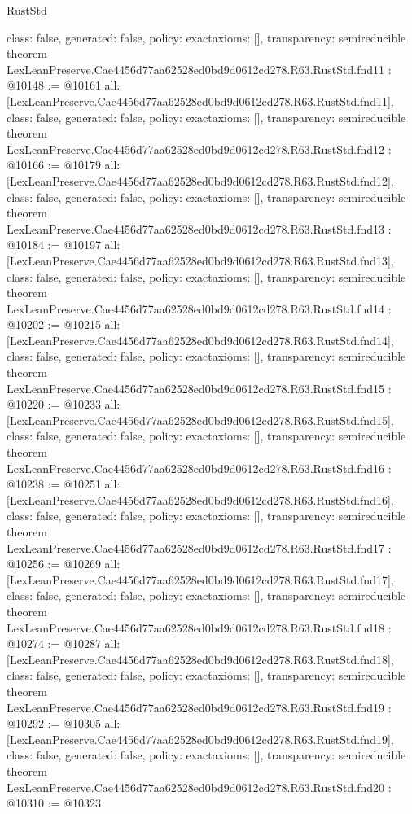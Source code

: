 \begin{lexlean}{RustStd}
\begin{coremodule}
{  class: false,
  generated: false,
  policy: exact{axioms: []},
  transparency: semireducible
}
theorem LexLeanPreserve.Cae4456d77aa62528ed0bd9d0612cd278.R63.RustStd.fnd11 : @10148 := @10161 {
  all: [LexLeanPreserve.Cae4456d77aa62528ed0bd9d0612cd278.R63.RustStd.fnd11],
  class: false,
  generated: false,
  policy: exact{axioms: []},
  transparency: semireducible
}
theorem LexLeanPreserve.Cae4456d77aa62528ed0bd9d0612cd278.R63.RustStd.fnd12 : @10166 := @10179 {
  all: [LexLeanPreserve.Cae4456d77aa62528ed0bd9d0612cd278.R63.RustStd.fnd12],
  class: false,
  generated: false,
  policy: exact{axioms: []},
  transparency: semireducible
}
theorem LexLeanPreserve.Cae4456d77aa62528ed0bd9d0612cd278.R63.RustStd.fnd13 : @10184 := @10197 {
  all: [LexLeanPreserve.Cae4456d77aa62528ed0bd9d0612cd278.R63.RustStd.fnd13],
  class: false,
  generated: false,
  policy: exact{axioms: []},
  transparency: semireducible
}
theorem LexLeanPreserve.Cae4456d77aa62528ed0bd9d0612cd278.R63.RustStd.fnd14 : @10202 := @10215 {
  all: [LexLeanPreserve.Cae4456d77aa62528ed0bd9d0612cd278.R63.RustStd.fnd14],
  class: false,
  generated: false,
  policy: exact{axioms: []},
  transparency: semireducible
}
theorem LexLeanPreserve.Cae4456d77aa62528ed0bd9d0612cd278.R63.RustStd.fnd15 : @10220 := @10233 {
  all: [LexLeanPreserve.Cae4456d77aa62528ed0bd9d0612cd278.R63.RustStd.fnd15],
  class: false,
  generated: false,
  policy: exact{axioms: []},
  transparency: semireducible
}
theorem LexLeanPreserve.Cae4456d77aa62528ed0bd9d0612cd278.R63.RustStd.fnd16 : @10238 := @10251 {
  all: [LexLeanPreserve.Cae4456d77aa62528ed0bd9d0612cd278.R63.RustStd.fnd16],
  class: false,
  generated: false,
  policy: exact{axioms: []},
  transparency: semireducible
}
theorem LexLeanPreserve.Cae4456d77aa62528ed0bd9d0612cd278.R63.RustStd.fnd17 : @10256 := @10269 {
  all: [LexLeanPreserve.Cae4456d77aa62528ed0bd9d0612cd278.R63.RustStd.fnd17],
  class: false,
  generated: false,
  policy: exact{axioms: []},
  transparency: semireducible
}
theorem LexLeanPreserve.Cae4456d77aa62528ed0bd9d0612cd278.R63.RustStd.fnd18 : @10274 := @10287 {
  all: [LexLeanPreserve.Cae4456d77aa62528ed0bd9d0612cd278.R63.RustStd.fnd18],
  class: false,
  generated: false,
  policy: exact{axioms: []},
  transparency: semireducible
}
theorem LexLeanPreserve.Cae4456d77aa62528ed0bd9d0612cd278.R63.RustStd.fnd19 : @10292 := @10305 {
  all: [LexLeanPreserve.Cae4456d77aa62528ed0bd9d0612cd278.R63.RustStd.fnd19],
  class: false,
  generated: false,
  policy: exact{axioms: []},
  transparency: semireducible
}
theorem LexLeanPreserve.Cae4456d77aa62528ed0bd9d0612cd278.R63.RustStd.fnd20 : @10310 := @10323 {
}
\end{coremodule}
\end{lexlean}
